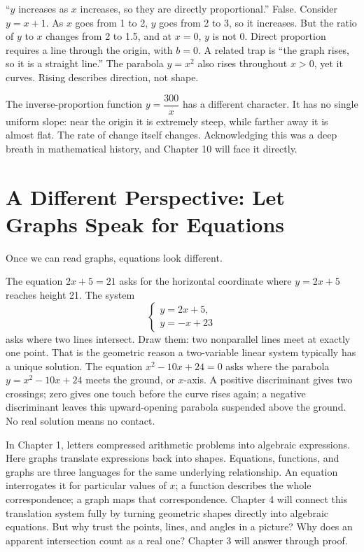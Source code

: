 \begin{fanli}
``$y$ increases as $x$ increases, so they are directly proportional.'' False. Consider $y = x + 1$. As $x$ goes from 1 to 2, $y$ goes from 2 to 3, so it increases. But the ratio of $y$ to $x$ changes from 2 to 1.5, and at $x = 0$, $y$ is not 0. Direct proportion requires a line through the origin, with $b = 0$. A related trap is ``the graph rises, so it is a straight line.'' The parabola $y = x^2$ also rises throughout $x > 0$, yet it curves. Rising describes direction, not shape.
\end{fanli}

The inverse-proportion function $y = \dfrac{300}{x}$ has a different character. It has no single uniform slope: near the origin it is extremely steep, while farther away it is almost flat. The rate of change itself changes. Acknowledging this was a deep breath in mathematical history, and Chapter 10 will face it directly.

\section{A Different Perspective: Let Graphs Speak for Equations}

Once we can read graphs, equations look different.

The equation $2x + 5 = 21$ asks for the horizontal coordinate where $y = 2x + 5$ reaches height 21. The system
\[
\begin{cases}
y = 2x + 5,\\
y = -x + 23
\end{cases}
\]
asks where two lines intersect. Draw them: two nonparallel lines meet at exactly one point. That is the geometric reason a two-variable linear system typically has a unique solution. The equation $x^2 - 10x + 24 = 0$ asks where the parabola $y = x^2 - 10x + 24$ meets the ground, or $x$-axis. A positive discriminant gives two crossings; zero gives one touch before the curve rises again; a negative discriminant leaves this upward-opening parabola suspended above the ground. No real solution means no contact.

\begin{lianjie}
In Chapter 1, letters compressed arithmetic problems into algebraic expressions. Here graphs translate expressions back into shapes. Equations, functions, and graphs are three languages for the same underlying relationship. An equation interrogates it for particular values of $x$; a function describes the whole correspondence; a graph maps that correspondence. Chapter 4 will connect this translation system fully by turning geometric shapes directly into algebraic equations. But why trust the points, lines, and angles in a picture? Why does an apparent intersection count as a real one? Chapter 3 will answer through proof.
\end{lianjie}

